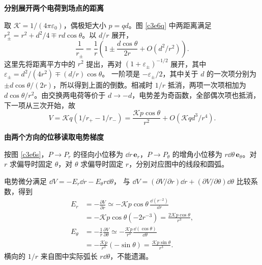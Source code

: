 \begin{solution}\textbf{分别展开两个电荷到场点的距离}\par\nobreak
取 $\mathcal K=1/(4\pi\varepsilon_0)$，偶极矩大小 $p=qd$。图 \ref{c3e6q} 中两距离满足
$r_\pm^2=r^2+d^2/4\mp rd\cos\theta$。以 $d/r$ 展开，
\[
 \frac1{r_\pm}
 =\frac1r\left(1\pm\frac{d\cos\theta}{2r}
 +O(d^2/r^2)\right).
\]
这里先将距离平方中的 $r^2$ 提出，再对
$(1+\varepsilon_\pm)^{-1/2}$ 展开，其中
$\varepsilon_\pm=d^2/(4r^2)\mp(d/r)\cos\theta$。
一阶项是 $-\varepsilon_\pm/2$，其中关于 $d$ 的一次项分别为 $\pm d\cos\theta/(2r)$，所以得到上面的倒数。相减时 $1/r$ 抵消，两项一次项相加为 $d\cos\theta/r^2$。由交换两电荷等价于 $d\to-d$，电势差为奇函数，全部偶次项也抵消，下一项从三次开始，故
\[
 V=\mathcal Kq(1/r_+-1/r_-)
 =\frac{\mathcal Kp\cos\theta}{r^2}
 +O(\mathcal Kqd^3/r^4).
\]



\par\medskip{}\noindent\textbf{由两个方向的位移读取电势梯度}\par\nobreak
按图 \ref{c3e6s}，$P\to P_r$ 的径向小位移为 $\dd r\,\bm e_r$，$P\to P_\theta$ 的增角小位移为 $r\dd\theta\,\bm e_\theta$。对 $r$ 求偏导时固定 $\theta$，对 $\theta$ 求偏导时固定 $r$，分别对应图中的线段和圆弧。

电势微分满足
$\dd V=-E_r\dd r-E_\theta r\dd\theta$，
与 $\dd V=(\partial V/\partial r)\dd r+(\partial V/\partial\theta)\dd\theta$ 比较系数，得到
\begin{align*}
E_r&=-\frac{\partial V}{\partial r}
\simeq-\mathcal Kp\cos\theta\,\frac{\dd(r^{-2})}{\dd r}\\
&=-\mathcal Kp\cos\theta(-2r^{-3})
=\frac{2\mathcal Kp\cos\theta}{r^3},\\
E_\theta&=-\frac1r\frac{\partial V}{\partial\theta}
\simeq-\frac{\mathcal Kp}{r^3}\frac{\dd(\cos\theta)}{\dd\theta}\\
&=-\frac{\mathcal Kp}{r^3}(-\sin\theta)
=\frac{\mathcal Kp\sin\theta}{r^3}.
\end{align*}
横向的 $1/r$ 来自图中实际弧长 $r\dd\theta$，不能遗漏。


\end{solution}
